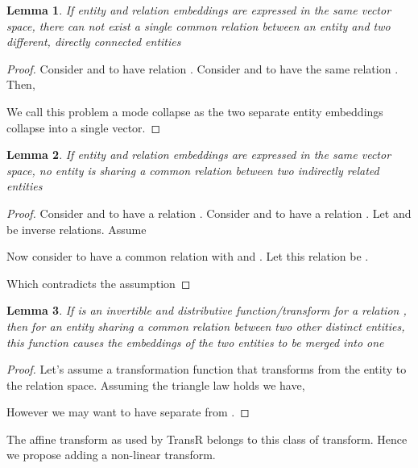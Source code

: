 \documentclass[sigconf]{acmart}
\newtheorem{lemma}{Lemma}[section]
\begin{document}
\begin{lemma}\label{lemma2}
If entity and relation embeddings are expressed in the same vector space, there can not exist a single common relation between an entity and two different, directly connected entities
\end{lemma}
\begin{proof}
Consider  and  to have relation . Consider  and  to have the same relation . Then,




\noindent We call this problem a mode collapse as the two separate entity embeddings collapse into a single vector.
\end{proof}

\begin{lemma}\label{lemma3}
If entity and relation embeddings are expressed in the same vector space, no entity is sharing a common relation between two indirectly related entities
\end{lemma}
\begin{proof}
Consider  and  to have a relation . Consider  and  to have a relation . Let  and  be inverse relations. Assume 


Now consider  to have a common relation with  and . Let this relation be .


Which contradicts the assumption
\end{proof}

\begin{lemma}\label{lemma4}
If  is an invertible and distributive function/transform for a relation , then for an entity sharing a common relation between two other distinct entities, this function causes the embeddings of the two entities to be merged into one
\end{lemma}
\begin{proof}
Let's assume a transformation function  that transforms from the entity to the relation space. Assuming the triangle law holds we have,








However we may want to have  separate from . 
\end{proof}
\noindent The affine transform as used by TransR\cite{DBLP:conf/aaai/LinLSLZ15} belongs to this class of transform. Hence we propose adding a non-linear transform.
\end{document}
